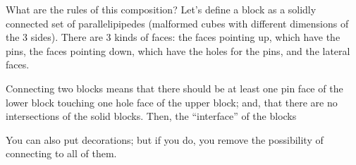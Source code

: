 What are the rules of this composition? Let's define a block as a solidly connected set of parallelipipedes (malformed cubes with different dimensions of the 3 sides). There are 3 kinds of faces: the faces pointing up, which have the pins, the faces pointing down, which have the holes for the pins, and the lateral faces.

Connecting two blocks means that there should be at least one pin face of the lower block touching one hole face of the upper block; and, that there are no intersections of the solid blocks. Then, the ``interface'' of the blocks


You can also put decorations; but if you do, you remove the possibility of connecting to all of them.



